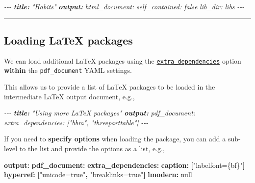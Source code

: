 \documentclass[
  a4paper,
  twoside,
  openright]{book}
\newenvironment{Shaded}{\begin{snugshade}}{\end{snugshade}}
\newcommand{\AnnotationTok}[1]{\textcolor[rgb]{0.56,0.35,0.01}{\textbf{\textit{#1}}}}
\newcommand{\AttributeTok}[1]{\textcolor[rgb]{0.13,0.29,0.53}{#1}}
\newcommand{\CharTok}[1]{\textcolor[rgb]{0.31,0.60,0.02}{#1}}
\newcommand{\CommentTok}[1]{\textcolor[rgb]{0.56,0.35,0.01}{\textit{#1}}}
\newcommand{\FunctionTok}[1]{\textcolor[rgb]{0.13,0.29,0.53}{\textbf{#1}}}
\newcommand{\KeywordTok}[1]{\textcolor[rgb]{0.13,0.29,0.53}{\textbf{#1}}}
\newcommand{\StringTok}[1]{\textcolor[rgb]{0.31,0.60,0.02}{#1}}
\theoremstyle{definition}
\theoremstyle{definition}
\theoremstyle{definition}
\theoremstyle{definition}
\theoremstyle{remark}
\begin{document}
\begin{Shaded}
\begin{Highlighting}[]
\CommentTok{{-}{-}{-}}
\AnnotationTok{title:}\CommentTok{ "Habits"}
\AnnotationTok{output:}
\CommentTok{  html\_document:}
\CommentTok{    self\_contained: false}
\CommentTok{    lib\_dir: libs}
\CommentTok{{-}{-}{-}}
\end{Highlighting}
\end{Shaded}

\begin{center}\rule{0.5\linewidth}{0.5pt}\end{center}

\subsection*{Loading LaTeX packages}\label{loading-latex-packages}

We can load additional LaTeX packages using the \href{https://bookdown.org/yihui/rmarkdown-cookbook/latex-extra.html}{\texttt{extra\_dependencies}} option {\textbf{within} the \texttt{pdf\_document}} YAML settings.

This allows us to provide a list of LaTeX packages to be loaded in the intermediate LaTeX output document, e.g.,

\begin{Shaded}
\begin{Highlighting}[]
\CommentTok{{-}{-}{-}}
\AnnotationTok{title:}\CommentTok{ "Using more LaTeX packages"}
\AnnotationTok{output:}\CommentTok{ }
\CommentTok{  pdf\_document:}
\CommentTok{    extra\_dependencies: ["bbm", "threeparttable"]}
\CommentTok{{-}{-}{-}}
\end{Highlighting}
\end{Shaded}

If you need to \textbf{specify options} when loading the package, you can add a sub-level to the list and provide the options as a list, e.g.,

\begin{Shaded}
\begin{Highlighting}[]
\FunctionTok{output}\KeywordTok{:}\AttributeTok{ }
\AttributeTok{  }\FunctionTok{pdf\_document}\KeywordTok{:}
\AttributeTok{    }\FunctionTok{extra\_dependencies}\KeywordTok{:}
\AttributeTok{      }\FunctionTok{caption}\KeywordTok{:}\AttributeTok{ }\KeywordTok{[}\StringTok{"labelfont=\{bf\}"}\KeywordTok{]}
\AttributeTok{      }\FunctionTok{hyperref}\KeywordTok{:}\AttributeTok{ }\KeywordTok{[}\StringTok{"unicode=true"}\KeywordTok{,}\AttributeTok{ }\StringTok{"breaklinks=true"}\KeywordTok{]}
\AttributeTok{      }\FunctionTok{lmodern}\KeywordTok{:}\AttributeTok{ }\CharTok{null}
\end{Highlighting}
\end{Shaded}
\end{document}
